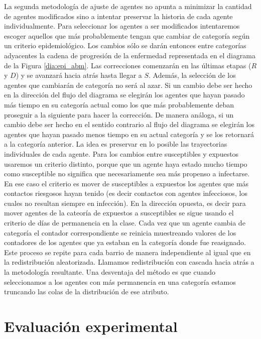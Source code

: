 La segunda metodología de ajuste de agentes no apunta a minimizar la cantidad de agentes modificados sino a intentar preservar la historia de cada agente individualmente. Para seleccionar los agentes a ser modificados intentaremos escoger aquellos que más probablemente tengan que cambiar de categoría según un criterio epidemiológico. Los cambios sólo se darán entonces entre categorías adyacentes la cadena de progresión de la enfermedad representada en el diagrama de la Figura \ref{dia:epi_abm}. Las correcciones comenzarán en las últimas etapas ($R$ y $D$) y se avanzará hacia atrás hasta llegar a $S$. Además, la selección de los agentes que cambiarán de categoría no será al azar. Si un cambio debe ser hecho en la dirección del flujo del diagrama se elegirán los agentes que hayan pasado más tiempo en su categoría actual como los que más probablemente deban proseguir a la siguiente para hacer la corrección. De manera análoga, si un cambio debe ser hecho en el sentido contrario al flujo del diagrama se elegirán los agentes que hayan pasado menos tiempo en su actual categoría y se los retornará a la categoría anterior. La idea es preservar en lo posible las trayectorias individuales de cada agente. Para los cambios entre susceptibles y expuestos usaremos un criterio distinto, porque que un agente haya estado mucho tiempo como susceptible no significa que necesariamente sea más propenso a infectarse. En ese caso el criterio es mover de susceptibles a expuestos los agentes que más contactos riesgosos hayan tenido (es decir contactos con agentes infecciosos, los cuales no resultan siempre en infección). En la dirección opuesta, es decir para mover agentes de la cateoría de expuestos a susceptibles se sigue usando el criterio de días de permanencia en la clase. Cada vez que un agente cambia de categoría el contador correspondiente se reinicia muestreando valores de los contadores de los agentes que ya estaban en la categoría donde fue reasignado. Este proceso se repite para cada barrio de manera independiente al igual que en la redistribución aleatorizada. Llamamos redistribución con cascada hacia atrás a la metodología resultante. Una desventaja del método es que cuando seleccionamos a los agentes con más permanencia en una categoría estamos truncando las colas de la distribución de ese atributo.

\section{Evaluación experimental}

